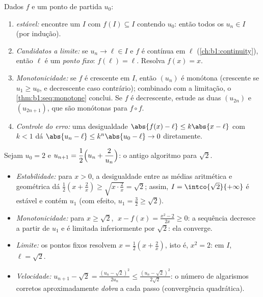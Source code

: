 \begin{method}[Estudando $u_{n+1} = f(u_n)$]\label{met:b1:seq:recurrent}
Dados $f$ e um ponto de partida $u_0$:
\begin{enumerate}
  \item \emph{ estável:} encontre um  $I$ com $f(I)
        \subseteq I$ contendo $u_0$: então todos os $u_n \in I$ (por
        indução).
  \item \emph{Candidatos a limite:} se $u_n \to \ell \in I$ e $f$ é
        contínua em $\ell$ (\cref{ch:b1:continuity}), então $\ell$
        é um \emph{ponto fixo}: $f(\ell) = \ell$. Resolva $f(x) = x$.
  \item \emph{Monotonicidade:} se $f$ é crescente em $I$, então
        $(u_n)$ é monótona (crescente se $u_1 \geq u_0$, e
        decrescente caso contrário); combinado com a limitação, o
        \cref{thm:b1:seq:monotone} conclui. Se $f$ é decrescente,
        estude as duas  $(u_{2n})$ e $(u_{2n+1})$,
        que são monótonas para $f \circ f$.
  \item \emph{Controle do erro:} uma desigualdade $\abs{f(x) - \ell} \leq
        k\abs{x - \ell}$ com $k < 1$ dá $\abs{u_n - \ell} \leq
        k^n \abs{u_0 - \ell} \to 0$ diretamente.
\end{enumerate}
\end{method}

\begin{example}\label{ex:b1:seq:heron}
Sejam $u_0 = 2$ e $u_{n+1} = \dfrac12\Bigl(u_n +
\dfrac{2}{u_n}\Bigr)$: o antigo algoritmo para
$\sqrt 2$.
\begin{itemize}
  \item \emph{Estabilidade:} para $x > 0$, a desigualdade entre as médias
        aritmética e geométrica dá $\frac12(x + \frac2x) \geq \sqrt{x \cdot
        \frac 2x} = \sqrt 2$; assim, $I = \intco{\sqrt 2}{+\infty}$ é
        estável e contém $u_1$ (com efeito, $u_1 = \frac32 \geq
        \sqrt 2$).
  \item \emph{Monotonicidade:} para $x \geq \sqrt 2$, $\;x - f(x) =
        \frac{x^2 - 2}{2x} \geq 0$: a sequência decresce a partir de
        $u_1$ e é limitada inferiormente por $\sqrt 2$: ela converge.
  \item \emph{Limite:} os pontos fixos resolvem $x = \frac12(x +
        \frac2x)$, isto é, $x^2 = 2$: em $I$, $\ell = \sqrt 2$.
  \item \emph{Velocidade:} $u_{n+1} - \sqrt 2 = \frac{(u_n -
        \sqrt2)^2}{2u_n} \leq \frac{(u_n - \sqrt 2)^2}{2\sqrt 2}$:
        o número de algarismos corretos aproximadamente \emph{dobra} a
        cada passo (convergência quadrática).
\end{itemize}
\end{example}

